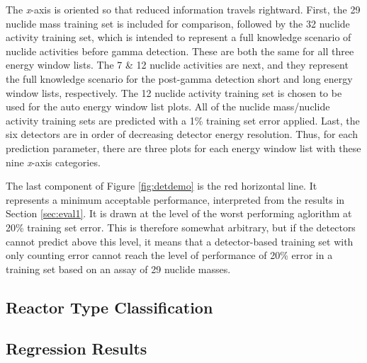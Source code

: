 The \textit{x}-axis is oriented so that reduced information travels rightward.
First, the 29 nuclide mass training set is included for comparison, followed by
the 32 nuclide activity training set, which is intended to represent a full
knowledge scenario of nuclide activities before gamma detection. These are both
the same for all three energy window lists.  The 7 \& 12 nuclide activities are
next, and they represent the full knowledge scenario for the post-gamma
detection short and long energy window lists, respectively.  The 12 nuclide
activity training set is chosen to be used for the auto energy window list
plots.  All of the nuclide mass/nuclide activity training sets are predicted
with a 1\% training set error applied.  Last, the six detectors are in order of
decreasing detector energy resolution. Thus, for each prediction parameter,
there are three plots for each energy window list with these nine
\textit{x}-axis categories. 

The last component of Figure \ref{fig:detdemo} is the red horizontal line.  It
represents a minimum acceptable performance, interpreted from the results in
Section \ref{sec:eval1}. It is drawn at the level of the worst performing
aglorithm at 20\% training set error.  This is therefore somewhat arbitrary,
but if the detectors cannot predict above this level, it means that a
detector-based training set with only counting error cannot reach the level of
performance of 20\% error in a training set based on an assay of 29 nuclide
masses.

\subsection{Reactor Type Classification}


\subsection{Regression Results}



